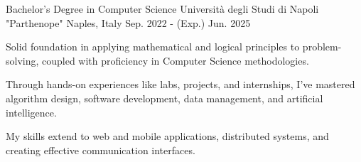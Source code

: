 

\begin{cventries}

	\cventry
	{Bachelor's Degree in Computer Science} %
	{Università degli Studi di Napoli "Parthenope"} %
	{Naples, Italy} %
	{Sep. 2022 - (Exp.) Jun. 2025 } %
	{
		\begin{cvitems} %
			\item {Solid foundation in applying mathematical and logical principles to problem-solving, coupled with proficiency in Computer Science methodologies.}
			\item {Through hands-on experiences like labs, projects, and internships, I've mastered algorithm design, software development, data management, and artificial intelligence.}
			\item {My skills extend to web and mobile applications, distributed systems, and creating effective communication interfaces.}
		\end{cvitems}
	}

\end{cventries}
